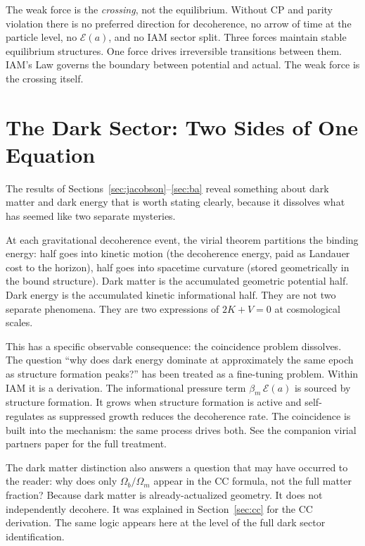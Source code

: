 \documentclass[12pt,a4paper]{article}
\begin{document}
The weak force is the \textit{crossing}, not the equilibrium. Without CP and
parity violation there is no preferred direction for decoherence, no arrow of
time at the particle level, no $\mathcal{E}(a)$, and no IAM sector split.
Three forces maintain stable equilibrium structures. One force drives irreversible
transitions between them. IAM's Law governs the boundary between potential and
actual. The weak force is the crossing itself.

\newpage

\section{The Dark Sector: Two Sides of One Equation}
\label{sec:darksector}

The results of Sections~\ref{sec:jacobson}--\ref{sec:ba} reveal something about
dark matter and dark energy that is worth stating clearly, because it dissolves
what has seemed like two separate mysteries.

At each gravitational decoherence event, the virial theorem partitions the
binding energy: half goes into kinetic motion (the decoherence energy, paid
as Landauer cost to the horizon), half goes into spacetime curvature (stored
geometrically in the bound structure). Dark matter is the accumulated geometric
potential half. Dark energy is the accumulated kinetic informational half.
They are not two separate phenomena. They are two expressions of $2K + V = 0$
at cosmological scales.

This has a specific observable consequence: the coincidence problem dissolves.
The question ``why does dark energy dominate at approximately the same epoch
as structure formation peaks?'' has been treated as a fine-tuning problem. Within
IAM it is a derivation. The informational pressure term $\beta_m\,\mathcal{E}(a)$
is sourced by structure formation. It grows when structure formation is active
and self-regulates as suppressed growth reduces the decoherence rate. The
coincidence is built into the mechanism: the same process drives both. See the
companion virial partners paper for the full treatment.

The dark matter distinction also answers a question that may have occurred to
the reader: why does only $\Omega_b/\Omega_m$ appear in the CC formula, not
the full matter fraction? Because dark matter is already-actualized geometry.
It does not independently decohere. It was explained in Section~\ref{sec:cc}
for the CC derivation. The same logic appears here at the level of the full
dark sector identification.
\end{document}
